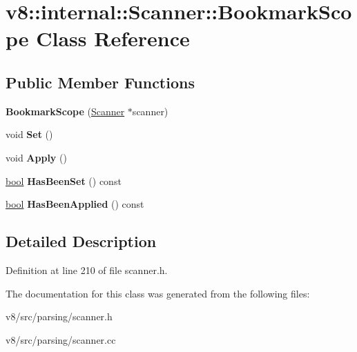 \hypertarget{classv8_1_1internal_1_1Scanner_1_1BookmarkScope}{}\section{v8\+:\+:internal\+:\+:Scanner\+:\+:Bookmark\+Scope Class Reference}
\label{classv8_1_1internal_1_1Scanner_1_1BookmarkScope}
\subsection*{Public Member Functions}
\begin{DoxyCompactItemize}
\item 
\mbox{\label{classv8_1_1internal_1_1Scanner_1_1BookmarkScope_aa9b38a37e87dec3c1a80ca64c7a6ffcb}} 
{\bfseries Bookmark\+Scope} (\mbox{\hyperlink{classv8_1_1internal_1_1Scanner}{Scanner}} $\ast$scanner)
\item 
\mbox{\label{classv8_1_1internal_1_1Scanner_1_1BookmarkScope_a55e9e73ff4b430f82eab67e7b4ba1048}} 
void {\bfseries Set} ()
\item 
\mbox{\label{classv8_1_1internal_1_1Scanner_1_1BookmarkScope_ac55f8ab94c89f6b9097207f3f53d00da}} 
void {\bfseries Apply} ()
\item 
\mbox{\label{classv8_1_1internal_1_1Scanner_1_1BookmarkScope_a581834eaa12a1b3c5038a19fb45e3177}} 
\mbox{\hyperlink{classbool}{bool}} {\bfseries Has\+Been\+Set} () const
\item 
\mbox{\label{classv8_1_1internal_1_1Scanner_1_1BookmarkScope_abca91e97f6dd775a8c289a36c963f3a6}} 
\mbox{\hyperlink{classbool}{bool}} {\bfseries Has\+Been\+Applied} () const
\end{DoxyCompactItemize}


\subsection{Detailed Description}


Definition at line 210 of file scanner.\+h.



The documentation for this class was generated from the following files\+:\begin{DoxyCompactItemize}
\item 
v8/src/parsing/scanner.\+h\item 
v8/src/parsing/scanner.\+cc\end{DoxyCompactItemize}
